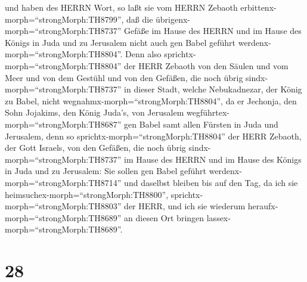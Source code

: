 und haben des HERRN Wort, so laßt sie vom HERRN Zebaoth
erbittenx-morph=``strongMorph:TH8799'', daß die
übrigenx-morph=``strongMorph:TH8737'' Gefäße im Hause des HERRN und im
Hause des Königs in Juda und zu Jerusalem nicht auch gen Babel geführt
werdenx-morph=``strongMorph:TH8804''.  Denn also
sprichtx-morph=``strongMorph:TH8804'' der HERR Zebaoth von den Säulen
und vom Meer und von dem Gestühl und von den Gefäßen, die noch übrig
sindx-morph=``strongMorph:TH8737'' in dieser Stadt,  welche
Nebukadnezar, der König zu Babel, nicht
wegnahmx-morph=``strongMorph:TH8804'', da er Jechonja, den Sohn
Jojakims, den König Juda's, von Jerusalem
wegführtex-morph=``strongMorph:TH8687'' gen Babel samt allen Fürsten in
Juda und Jerusalem,  denn so
sprichtx-morph=``strongMorph:TH8804'' der HERR Zebaoth, der Gott
Israels, von den Gefäßen, die noch übrig
sindx-morph=``strongMorph:TH8737'' im Hause des HERRN und im Hause des
Königs in Juda und zu Jerusalem:  Sie sollen gen Babel
geführt werdenx-morph=``strongMorph:TH8714'' und daselbst bleiben bis
auf den Tag, da ich sie heimsuchex-morph=``strongMorph:TH8800'',
sprichtx-morph=``strongMorph:TH8803'' der HERR, und ich sie wiederum
heraufx-morph=``strongMorph:TH8689'' an diesen Ort bringen
lassex-morph=``strongMorph:TH8689''.

\hypertarget{section-27}{%
\section{28}\label{section-27}}

